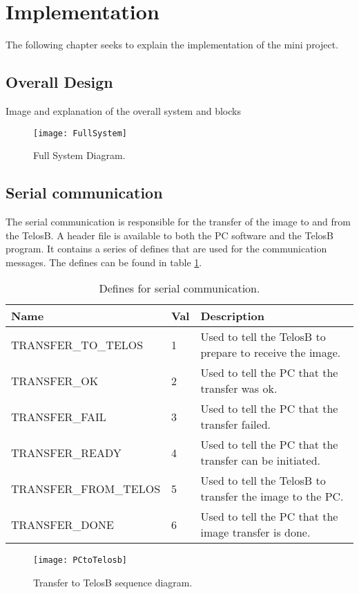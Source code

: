 \section{Implementation}
The following chapter seeks to explain the implementation of the mini project.\\

\subsection{Overall Design}
Image and explanation of the overall system and blocks\\
\begin{figure}[H]
	\centering
	\texttt{[image: FullSystem]}
	\caption{Full System Diagram.}
	\label{FullSystem}
\end{figure}

\subsection{Serial communication}
The serial communication is responsible for the transfer of the image to and from the TelosB. A header file is available to both the PC software and the TelosB program. It contains a series of defines that are used for the communication messages. The defines can be found in table \ref{definetable}.
\begin{table}[H]
    \begin{tabular}{|l|l|l|}
    \hline
    Name                  & Val & Description                                               \\ \hline
    TRANSFER\_TO\_TELOS   & 1     & Used to tell the TelosB to prepare to receive the image. \\ \hline
    TRANSFER\_OK          & 2     & Used to tell the PC that the transfer was ok.             \\ \hline
    TRANSFER\_FAIL        & 3     & Used to tell the PC that the transfer failed.             \\ \hline
    TRANSFER\_READY       & 4     & Used to tell the PC that the transfer can be initiated.   \\ \hline
    TRANSFER\_FROM\_TELOS & 5     & Used to tell the TelosB to transfer the image to the PC.  \\ \hline
    TRANSFER\_DONE        & 6     & Used to tell the PC that the image transfer is done.      \\ \hline
    \end{tabular}
    \caption{Defines for serial communication.}
    \label{definetable}
\end{table}
\begin{figure}[H]
	\centering
	\texttt{[image: PCtoTelosb]}
	\caption{Transfer to TelosB sequence diagram.}
	\label{transfertotelos}
\end{figure}

